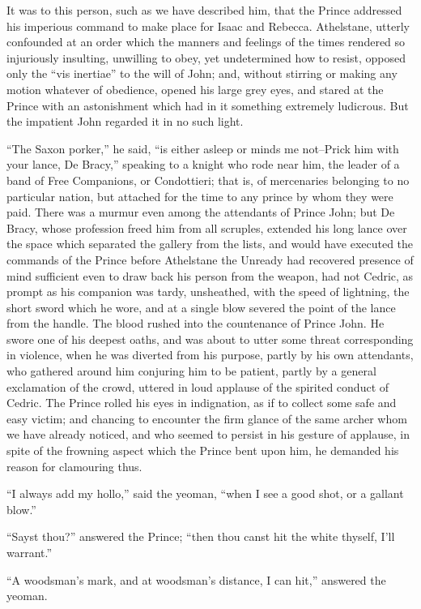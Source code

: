 It was to this person, such as we have described him, that the Prince
addressed his imperious command to make place for Isaac and Rebecca.
Athelstane, utterly confounded at an order which the manners and
feelings of the times rendered so injuriously insulting, unwilling to
obey, yet undetermined how to resist, opposed only the ``vis inertiae''
to the will of John; and, without stirring or making any motion whatever
of obedience, opened his large grey eyes, and stared at the Prince with
an astonishment which had in it something extremely ludicrous. But the
impatient John regarded it in no such light.

``The Saxon porker,'' he said, ``is either asleep or minds me not--Prick
him with your lance, De Bracy,'' speaking to a knight who rode near him,
the leader of a band of Free Companions, or Condottieri; that is, of
mercenaries belonging to no particular nation, but attached for the time
to any prince by whom they were paid. There was a murmur even among the
attendants of Prince John; but De Bracy, whose profession freed him from
all scruples, extended his long lance over the space which separated the
gallery from the lists, and would have executed the commands of the
Prince before Athelstane the Unready had recovered presence of mind
sufficient even to draw back his person from the weapon, had not Cedric,
as prompt as his companion was tardy, unsheathed, with the speed of
lightning, the short sword which he wore, and at a single blow severed
the point of the lance from the handle. The blood rushed into the
countenance of Prince John. He swore one of his deepest oaths, and was
about to utter some threat corresponding in violence, when he was
diverted from his purpose, partly by his own attendants, who gathered
around him conjuring him to be patient, partly by a general exclamation
of the crowd, uttered in loud applause of the spirited conduct of
Cedric. The Prince rolled his eyes in indignation, as if to collect some
safe and easy victim; and chancing to encounter the firm glance of the
same archer whom we have already noticed, and who seemed to persist in
his gesture of applause, in spite of the frowning aspect which the
Prince bent upon him, he demanded his reason for clamouring thus.

``I always add my hollo,'' said the yeoman, ``when I see a good shot, or
a gallant blow.''

``Sayst thou?'' answered the Prince; ``then thou canst hit the white
thyself, I'll warrant.''

``A woodsman's mark, and at woodsman's distance, I can hit,'' answered
the yeoman.

